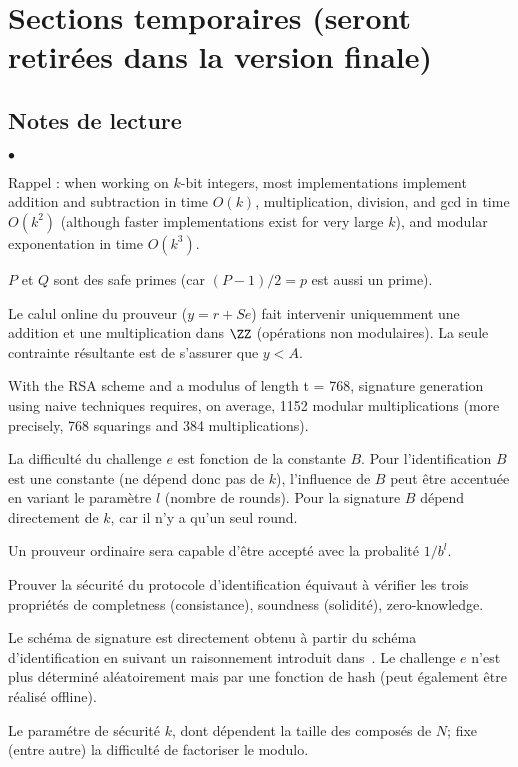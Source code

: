 \section{Sections temporaires (seront retirées dans la version finale)}

\subsection{Notes de lecture}

\begin{list}{\texttt{$\bullet$}}{}
\item Rappel : when working on $k$-bit integers, most implementations implement addition and subtraction in time $O(k)$, multiplication, division, and gcd in time $O(k^2)$ (although faster implementations exist for very large $k$), and modular exponentation in time $O(k^3)$.
\item $P$ et $Q$ sont des safe primes (car $(P-1)/2=p$ est aussi un prime).
\item Le calul online du prouveur ($y = r + Se$) fait intervenir uniquemment une addition et une multiplication dans $\ZZ$ (opérations non modulaires). La seule contrainte résultante est de s'assurer que $y < A$.
\item With the RSA scheme and a modulus of length t = 768, signature generation using naive techniques requires, on average, 1152 modular multiplications (more precisely, 768 squarings and 384 multiplications).
\item La difficulté du challenge $e$ est fonction de la constante $B$. Pour l'identification $B$ est une constante (ne dépend donc pas de $k$), l'influence de $B$ peut être accentuée en variant le paramètre $l$ (nombre de rounds). Pour la signature $B$ dépend directement de $k$, car il n'y a qu'un seul round.
\item Un prouveur ordinaire sera capable d'être accepté avec la probalité $1/b^l$.
\item Prouver la sécurité du protocole d'identification équivaut à vérifier les trois propriétés de completness (consistance), soundness (solidité), zero-knowledge.
\item Le schéma de signature est directement obtenu à partir du schéma d'identification en suivant un raisonnement introduit dans~\cite{ZK}. Le challenge $e$ n'est plus déterminé aléatoirement mais par une fonction de hash (peut également être réalisé offline).
\item Le paramétre de sécurité $k$, dont dépendent la taille des composés de $N$; fixe (entre autre) la difficulté de factoriser le modulo.

\end{list}
